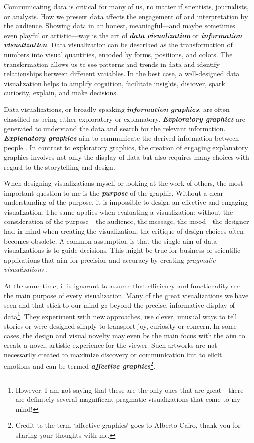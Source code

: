 \documentclass[
]{krantz}
\begin{document}
Communicating data is critical for many of us, no matter if scientists, journalists, or analysts. How we present data affects the engagement of and interpretation by the audience. Showing data in an honest, meaningful---and maybe sometimes even playful or artistic---way is the art of \textbf{\emph{data visualization}} or \textbf{\emph{information visualization}}. Data visualization can be described as the transformation of numbers into visual quantities, encoded by forms, positions, and colors. The transformation allows us to see patterns and trends in data and identify relationships between different variables. In the best case, a well-designed data visualization helps to amplify cognition, facilitate insights, discover, spark curiosity, explain, and make decisions.

Data visualizations, or broadly speaking \textbf{\emph{information graphics}}, are often classified as being either exploratory or explanatory. \textbf{\emph{Exploratory graphics}} are generated to understand the data and search for the relevant information. \textbf{\emph{Explanatory graphics}} aim to communicate the derived information between people \citep{koponen&hilden2019}. In contrast to exploratory graphics, the creation of engaging explanatory graphics involves not only the display of data but also requires many choices with regard to the storytelling and design.

When designing visualizations myself or looking at the work of others, the most important question to me is the \textbf{\emph{purpose}} of the graphic. Without a clear understanding of the purpose, it is impossible to design an effective and engaging visualization. The same applies when evaluating a visualization: without the consideration of the purpose---the audience, the message, the mood---the designer had in mind when creating the visualization, the critique of design choices often becomes obsolete. A common assumption is that the single aim of data visualizations is to guide decisions. This might be true for business or scientific applications that aim for precision and accuracy by creating \emph{pragmatic visualizations} \citep{kosara2007}.

At the same time, it is ignorant to assume that efficiency and functionality are the main purpose of every visualization. Many of the great visualizations we have seen and that stick to our mind go beyond the precise, informative display of data\footnote{However, I am not saying that these are the only ones that are great---there are definitely several magnificent pragmatic visualizations that come to my mind!}. They experiment with new approaches, use clever, unusual ways to tell stories or were designed simply to transport joy, curiosity or concern. In some cases, the design and visual novelty may even be the main focus with the aim to create a novel, artistic experience for the viewer. Such artworks are not necessarily created to maximize discovery or communication but to elicit emotions and can be termed \textbf{\emph{affective graphics}}\footnote{Credit to the term `affective graphics' goes to Alberto Cairo, thank you for sharing your thoughts with me.}.
\end{document}
